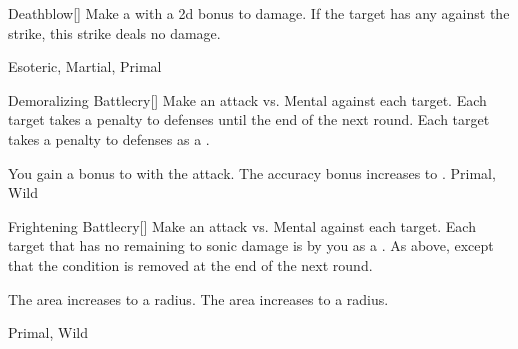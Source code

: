 \lowercase{\hypertarget{maneuver:Deathblow}{}}\label{maneuver:Deathblow}
\hypertarget{maneuver:Deathblow}{}
\begin{freeability}[Rank 3]{Deathblow}[]
Make a  with a \plus2d bonus to damage.
If the target has any  against the strike, this strike deals no damage.


 Esoteric, Martial, Primal
\end{freeability}
\vspace{0.25em}



\lowercase{\hypertarget{maneuver:Demoralizing Battlecry}{}}\label{maneuver:Demoralizing Battlecry}
\hypertarget{maneuver:Demoralizing Battlecry}{}
\begin{freeability}[Rank 3]{Demoralizing Battlecry}[]
Make an attack vs. Mental against each target.
\hit Each target takes a  penalty to defenses until the end of the next round.
\crit Each target takes a  penalty to defenses as a .

\rankline
{} You gain a  bonus to  with the attack.
 The accuracy bonus increases to .
 Primal, Wild
\end{freeability}
\vspace{0.25em}



\lowercase{\hypertarget{maneuver:Frightening Battlecry}{}}\label{maneuver:Frightening Battlecry}
\hypertarget{maneuver:Frightening Battlecry}{}
\begin{freeability}[Rank 3]{Frightening Battlecry}[]
Make an attack vs. Mental against each target.
\hit Each target that has no remaining  to sonic damage is  by you as a .
\glance As above, except that the condition is removed at the end of the next round.

\rankline
{} The area increases to a \areamed radius.
 The area increases to a \arealarge radius.


 Primal, Wild
\end{freeability}
\vspace{0.25em}



